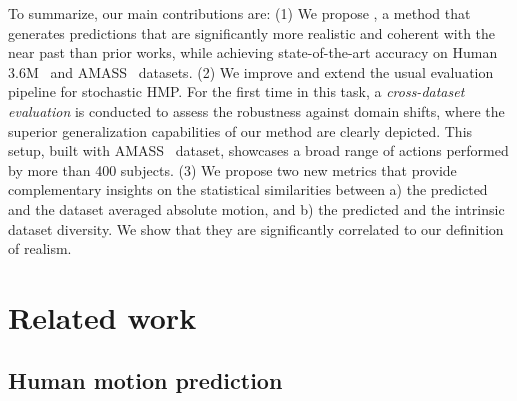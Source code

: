 \documentclass[10pt,twocolumn,letterpaper]{article}
\begin{document}
To summarize, our main contributions are: (1) We propose \modelname{}, a method that generates predictions that are significantly more realistic and coherent with the near past than prior works, while achieving state-of-the-art accuracy on Human 3.6M~\cite{ionescu2013h36m} and AMASS~\cite{mahmood2019amass} datasets.
(2) We improve and extend the usual evaluation pipeline for stochastic HMP. For the first time in this task, a \textit{cross-dataset evaluation} is conducted to assess the robustness against domain shifts, where the superior generalization capabilities of our method are clearly depicted. This setup, built with AMASS~\cite{mahmood2019amass} dataset, showcases a broad range of actions performed by more than 400 subjects.
(3) We propose two new metrics that provide complementary insights on the statistical similarities between a) the predicted and the dataset averaged absolute motion, and b) the predicted and the intrinsic dataset diversity. We show that they are significantly correlated to our definition of realism. 
\def\obsT{B}
\def\predT{T}
\def\xmotion{\mathbf{x}_{m}}
\def\obs{\mathbf{X}}
\def\pred{\mathbf{Y}}

\def\encoder{\mathcal{E}}
\def\decoder{\mathcal{D}}
\def\ldFunction{f_{\Phi}}
\def\latcode{z}
\def\diffused{\latcode_{t}}
\def\diffusedPrev{\latcode_{t-1}}
\def\diffusedStart{\latcode_{0}}

\def\extPred{\pred_{e}}
\def\bvaeEncParams{\theta}
\def\bvaeDecParams{\phi}
\def\bvaeAuxDecParams{\omega}
\def\bvaeXmotionEncParams{\alpha}
\def\bvaeXmotionEnc{g_{\bvaeXmotionEncParams}}
\def\vaeObsEncParams{\lambda}
\def\vaeObsEnc{h_{\vaeObsEncParams}}
\def\bvaeDec{\mathcal{B}_{\bvaeDecParams}}
\def\bvaeEnc{p_{\bvaeEncParams}}
\def\bvaeAuxDec{r_{\bvaeAuxDecParams}}

\def\lossrec{\mathcal{L}_{rec}}
\def\losslat{\mathcal{L}_{lat}}




\section{Related work}
\label{sec:relatedwork}


\subsection{Human motion prediction}
\end{document}
